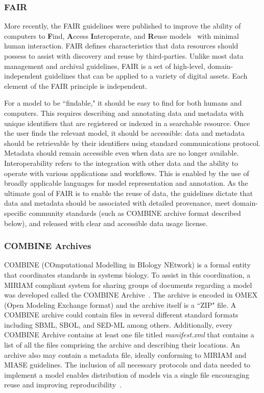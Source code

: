 \documentclass[12pt]{report}
\begin{document}
\subsubsection{FAIR}
More recently, the FAIR guidelines were published to improve the ability of computers to \textbf{F}ind, \textbf{A}ccess \textbf{I}nteroperate, and \textbf{R}euse models~\cite{Wilkinson2016} with minimal human interaction. FAIR defines characteristics that data resources should possess to assist with discovery and reuse by third-parties. Unlike most data management and archival guidelines, FAIR is a set of high-level, domain-independent guidelines that can be applied to a variety of digital assets. Each element of the FAIR principle is independent. 

For a model to be ``findable," it should be easy to find for both humans and computers. This requires describing and annotating data and metadata with unique identifiers that are registered or indexed in a searchable resource. Once the user finds the relevant model, it should be accessible: data and metadata should be retrievable by their identifiers using standard communications protocol. Metadata should remain accessible even when data are no longer available. Interoperability refers to the integration with other data and the ability to operate with various applications and workflows. This is enabled by the use of broadly applicable languages for model representation and annotation. As the ultimate goal of FAIR is to enable the reuse of data, the guidelines dictate that data and metadata should be associated with detailed provenance, meet domain-specific community standards (such as COMBINE archive format described below), and released with clear and accessible data usage license.


\subsubsection{COMBINE Archives}
COMBINE (COmputational Modelling in BIology NEtwork) is a formal entity that coordinates standards in systems biology.  To assist in this coordination, a MIRIAM compliant system for sharing groups of documents regarding a model was developed called the COMBINE Archive~\cite{schreiber_specifications_2020}. The archive is encoded in OMEX (Open Modeling Exchange format) and the archive itself is a ``ZIP" file. A COMBINE archive could contain files in several different standard formats including SBML, SBOL, and SED-ML among others. Additionally, every COMBINE Archive contains at least one file titled \textit{manifest.xml} that contains a list of all the files comprising the archive and describing their locations. An archive also may contain a metadata file, ideally conforming to MIRIAM and MIASE guidelines. The inclusion of all necessary protocols and data needed to implement a model enables distribution of models via a single file encouraging reuse and improving reproducibility~\cite{bergmann_combine_2014}.
\end{document}
